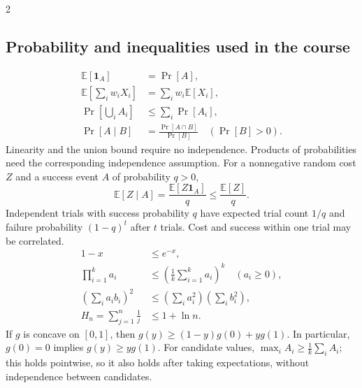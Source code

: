 \documentclass[8pt]{extarticle}
\theoremstyle{definition}
\begin{document}
\begin{multicols*}{2}
\subsection{Probability and inequalities used in the course}
\begin{align*}
\mathbb E[\mathbf1_A]&=\Pr[A],\\
\mathbb E\!\left[\sum_iw_iX_i\right]&=\sum_iw_i\mathbb E[X_i],\\
\Pr\!\left[\bigcup_i A_i\right]&\le\sum_i\Pr[A_i],\\
\Pr[A\mid B]&=\frac{\Pr[A\cap B]}{\Pr[B]}\quad(\Pr[B]>0).
\end{align*}
Linearity and the union bound require no independence. Products of probabilities need
the corresponding independence assumption. For a nonnegative random cost $Z$ and a success
event $A$ of probability $q>0$,
\[
\mathbb E[Z\mid A]=\frac{\mathbb E[Z\mathbf1_A]}q\le\frac{\mathbb E[Z]}q.
\]
Independent trials with success probability $q$ have expected trial count $1/q$ and
failure probability $(1-q)^t$ after $t$ trials. Cost and success within one trial may be correlated.
\begin{align*}
1-x&\le e^{-x},\\
\prod_{i=1}^k a_i&\le\left(\frac1k\sum_{i=1}^k a_i\right)^k\quad(a_i\ge0),\\
\left(\sum_i a_ib_i\right)^2&\le\left(\sum_i a_i^2\right)\left(\sum_i b_i^2\right),\\
H_n=\sum_{j=1}^n\frac1j&\le1+\ln n.
\end{align*}
If $g$ is concave on $[0,1]$, then
$g(y)\ge(1-y)g(0)+yg(1)$. In particular, $g(0)=0$ implies $g(y)\ge yg(1)$.
For candidate values, $\max_i A_i\ge\frac1k\sum_i A_i$; this holds pointwise, so it also
holds after taking expectations, without independence between candidates.


\end{multicols*}
\end{document}
